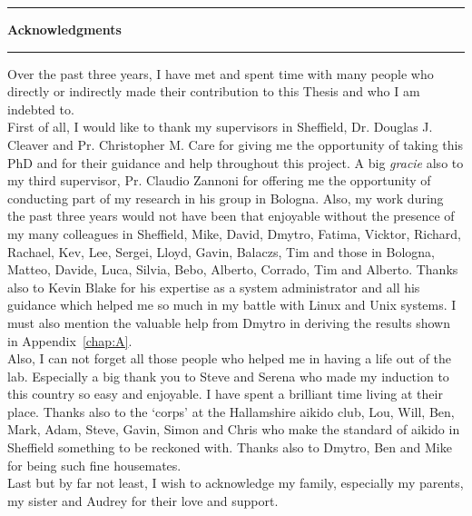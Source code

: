 

\hrule
\begin{center}
	\textbf{\large Acknowledgments}
\end{center}
\hrule
\vspace*{15mm}


Over the past three years, I have met and spent time with many people who directly or indirectly
made their contribution to this Thesis and who I am indebted to.\\
%
First of all, I would like to thank
my supervisors in Sheffield, Dr. Douglas J. Cleaver and Pr. Christopher M. Care for giving me 
the opportunity of taking this PhD and for their guidance and help throughout this project. 
A big \emph{gracie} also to my third supervisor, Pr. Claudio Zannoni for offering me the
opportunity of conducting part of my research in his group in Bologna. Also, my work during the
past three years would not have been that enjoyable without the presence of my many colleagues
in Sheffield, Mike, David, Dmytro, Fatima, Vicktor, Richard, Rachael, Kev, Lee, Sergei, Lloyd,
Gavin, Balaczs, Tim and those in Bologna, Matteo, Davide, Luca, Silvia, Bebo, Alberto,
Corrado, Tim and Alberto. Thanks also to Kevin Blake for his expertise as a system administrator and
all his guidance which helped me so much in my battle with Linux and Unix systems. I must also
mention the valuable help from Dmytro in deriving the results shown in Appendix~\ref{chap:A}.\\
%
Also, I can not forget all those people who helped me in having a life out of the lab. Especially
a big thank you to Steve and Serena who made my induction to this country so easy and enjoyable.
I have spent a brilliant time living at their place. Thanks also to the `corps' at the
Hallamshire aikido club, Lou, Will, Ben, Mark, Adam, Steve, Gavin, Simon and Chris who make the
standard of aikido in Sheffield something to be reckoned with. 
Thanks also to Dmytro, Ben and Mike for being such fine housemates.\\
%
Last but by far not least, I wish to acknowledge my family, especially my parents, my
sister and Audrey for their love and support.

